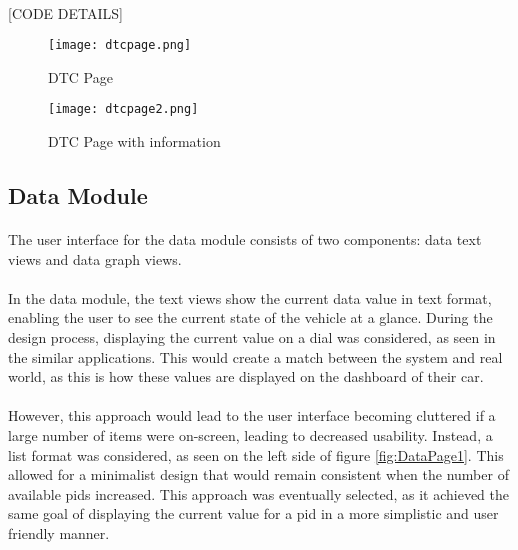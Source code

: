 		\paragraph{}{
		[CODE DETAILS]
		}
		\begin{figure}[h]
			\begin{center}								
				\begin{minipage}{0.49\textwidth}
					\texttt{[image: dtcpage.png]}
					\caption{DTC Page}						
					\label{fig:DTCPage1}
				\end{minipage}
				\hfill			
				\begin{minipage}{0.49\textwidth}
					\texttt{[image: dtcpage2.png]}
					\caption{DTC Page with information}						
					\label{fig:DTCPage2}
				\end{minipage}									
			\end{center}
		\end{figure}
	\newpage
	\subsection{Data Module}
		\paragraph{}{	
		The user interface for the data module consists of two components: data text views and data graph views.  
		}
		\paragraph{}{
		In the data module, the text views show the current data value in text format, enabling the user to see the current state of the vehicle at a glance. During the design process, displaying the current value on a dial was considered, as seen in the similar applications. This would create a match between the system and real world, as this is how these values are displayed on the dashboard of their car.
		}
		\paragraph{}{
		However, this approach would lead to the user interface becoming cluttered if a large number of items were on-screen, leading to decreased usability. Instead, a list format was considered, as seen on the left side of figure \ref{fig:DataPage1}. This allowed for a minimalist design that would remain consistent when the number of available pids increased. This approach was eventually selected, as it achieved the same goal of displaying the current value for a pid in a more simplistic and user friendly manner.
		}
